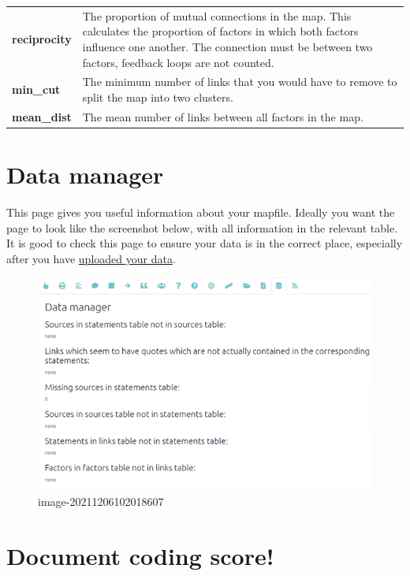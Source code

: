 \documentclass[
]{book}
\begin{document}
\begin{longtable}[]{@{}
  >{\raggedright\arraybackslash}p{}
  >{\raggedright\arraybackslash}p{}@{}}
\textbf{reciprocity} & The proportion of mutual connections in the map. This calculates the proportion of factors in which both factors influence one another. The connection must be between two factors, feedback loops are not counted. \\
\textbf{min\_cut} & The minimum number of links that you would have to remove to split the map into two clusters. \\
\textbf{mean\_dist} & The mean number of links between all factors in the map. \\
\bottomrule()
\end{longtable}

\hypertarget{xdata-manager}{%
\chapter{Data manager}\label{xdata-manager}}

This page gives you useful information about your mapfile. Ideally you want the page to look like the screenshot below, with all information in the relevant table. It is good to check this page to ensure your data is in the correct place, especially after you have \protect\hyperlink{ximport}{uploaded your data}.

\begin{figure}
\centering
\includegraphics[width=6.77083in,height=\textheight]{_assets/image-20211206102018607.png}
\caption{image-20211206102018607}
\end{figure}

\hypertarget{xgamification}{%
\chapter{Document coding score!}\label{xgamification}}
\end{document}
